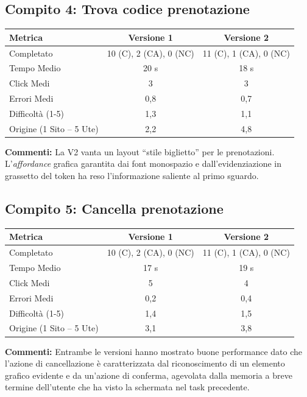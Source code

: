 \subsection{Compito 4: Trova codice prenotazione}
\begin{table}[H]
\centering
\renewcommand{\arraystretch}{1.2}
\small
\begin{tabular}{|l|c|c|}
\hline
\textbf{Metrica} & \textbf{Versione 1} & \textbf{Versione 2} \\
\hline
Completato & 10 (C), 2 (CA), 0 (NC) & 11 (C), 1 (CA), 0 (NC) \\ \hline
Tempo Medio & 20 s & 18 s \\ \hline
Click Medi & 3 & 3 \\ \hline
Errori Medi & 0,8 & 0,7 \\ \hline
Difficoltà (1-5) & 1,3 & 1,1 \\ \hline
Origine (1 Sito -- 5 Ute) & 2,2 & 4,8 \\ \hline
\end{tabular}
\end{table}
\textbf{Commenti:} La V2 vanta un layout ``stile biglietto'' per le prenotazioni. L'\textit{affordance} grafica garantita dai font monospazio e dall'evidenziazione in grassetto del token ha reso l'informazione saliente al primo sguardo.

\subsection{Compito 5: Cancella prenotazione}
\begin{table}[H]
\centering
\renewcommand{\arraystretch}{1.2}
\small
\begin{tabular}{|l|c|c|}
\hline
\textbf{Metrica} & \textbf{Versione 1} & \textbf{Versione 2} \\
\hline
Completato & 10 (C), 2 (CA), 0 (NC) & 11 (C), 1 (CA), 0 (NC) \\ \hline
Tempo Medio & 17 s & 19 s \\ \hline
Click Medi & 5 & 4 \\ \hline
Errori Medi & 0,2 & 0,4 \\ \hline
Difficoltà (1-5) & 1,4 & 1,5 \\ \hline
Origine (1 Sito -- 5 Ute) & 3,1 & 3,8 \\ \hline
\end{tabular}
\end{table}
\textbf{Commenti:} Entrambe le versioni hanno mostrato buone performance dato che l'azione di cancellazione è caratterizzata dal riconoscimento di un elemento grafico evidente e da un'azione di conferma, agevolata dalla memoria a breve termine dell'utente che ha visto la schermata nel task precedente.

